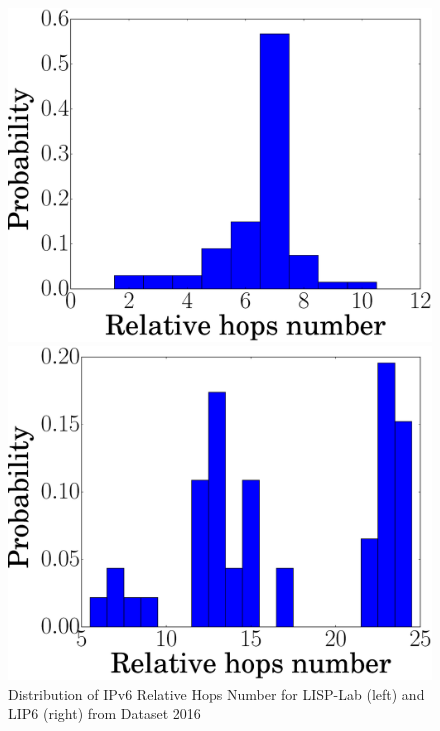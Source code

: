 \begin{figure}[!t]
	\begin{minipage}[c]{.49\linewidth}
		\begin{center}
			\includegraphics[width=\textwidth]{Pics/v6/Relative_hops_num_LISP-Lab-FranceIX_hist_changed_60.eps}
		\end{center}
	\end{minipage}
	\begin{minipage}[c]{.49\linewidth}
		\begin{center}
			\includegraphics[width=\textwidth]{Pics/v6/Relative_hops_num_LIP6-FranceIX_hist_changed_60.eps}
		\end{center}
	\end{minipage}
	\vspace{-0.5mm}
	\caption{Distribution of IPv6 Relative Hops Number for LISP-Lab (left) and LIP6 (right) from Dataset 2016}
	\label{Distribution_v6_relative_hops_num_proporation_LISP-Lab_LIP6}
\end{figure}

